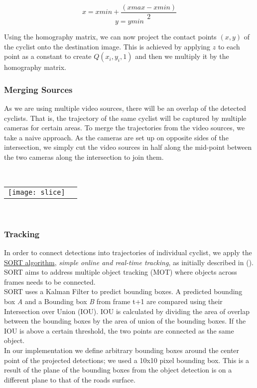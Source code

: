 $$x = xmin + \frac{(xmax - xmin)}{2}$$
$$y = ymin$$

Using the homography matrix, we can now project the contact points $(x, y)$ of the cyclist onto the destination
image. This is achieved by applying $z$ to each point as a constant to create $Q(x_i, y_i, 1)$ and then we multiply it by the homography matrix. 

\subsubsection{Merging Sources}
As we are using multiple video sources, there will be an overlap of the detected cyclists. 
That is, the trajectory of the same cyclist will be captured by multiple cameras for certain areas. 
To merge the trajectories from the video sources, we take a naive approach. As the cameras are set up on
opposite sides of the intersection, we simply cut the video sources in half along the mid-point between
the two cameras along the intersection to join them.

\ \\ 
\noindent
\begin{tabular}{@{}cc}
\texttt{[image: slice]} 
\end{tabular}
\label{slice}
\

\subsubsection{Tracking}

In order to connect detections into trajectories of individual cyclist, we apply 
the \href{https://github.com/abewley/sort}{SORT algorithm}, \textit{simple online and real-time tracking}, as initially described in (\cite{Bewley2016_sort}). 
SORT aims to address multiple object tracking (MOT) where objects across frames needs to be connected. 
\ \\ 

SORT uses a Kalman Filter to predict bounding boxes. A predicted bounding box \textit{A} and a Bounding box \textit{B} from 
frame t+1 are compared using their Intersection over Union (IOU). IOU is calculated by dividing the area of overlap between the 
bounding boxes by the area of union of the bounding boxes. If the IOU is above a certain threshold, the two points are connected as the same object.
\ \\ 

In our implementation we define arbitrary bounding boxes around the center point of the projected detections; 
we used a 10x10 pixel bounding box. This is a result of the plane of the bounding boxes from the object detection is on
a different plane to that of the roads surface.

